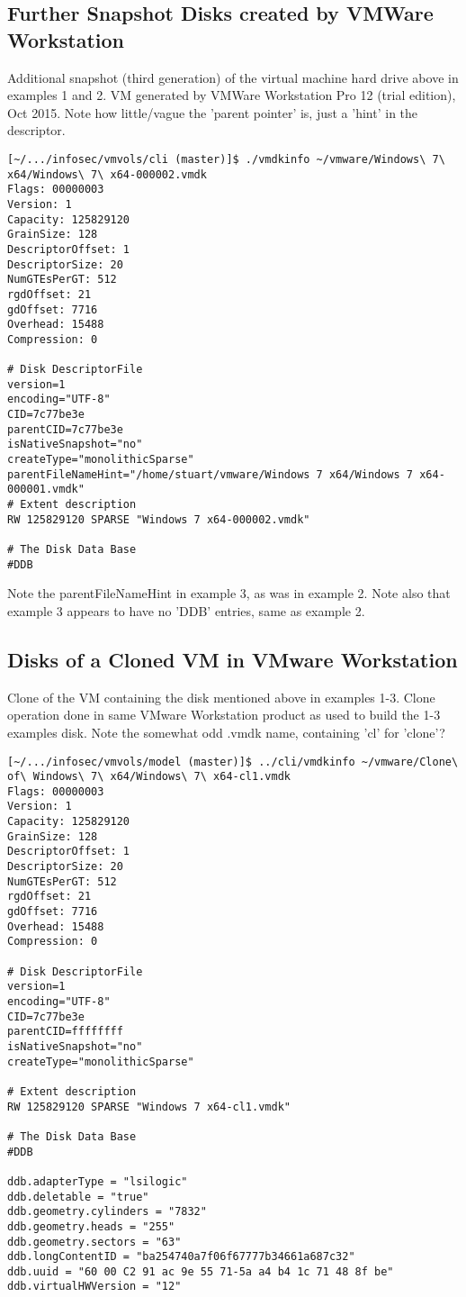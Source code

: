 \documentclass{article}
\begin{document}
\subsection{Further Snapshot Disks created by VMWare Workstation}

Additional snapshot (third generation) of the virtual machine hard
drive above in examples 1 and 2. VM generated by VMWare Workstation
Pro 12 (trial edition), Oct 2015.  Note how little/vague the 'parent
pointer' is, just a 'hint' in the descriptor.

\begin{verbatim}
[~/.../infosec/vmvols/cli (master)]$ ./vmdkinfo ~/vmware/Windows\ 7\ x64/Windows\ 7\ x64-000002.vmdk 
Flags: 00000003
Version: 1
Capacity: 125829120
GrainSize: 128
DescriptorOffset: 1
DescriptorSize: 20
NumGTEsPerGT: 512
rgdOffset: 21
gdOffset: 7716
Overhead: 15488
Compression: 0

# Disk DescriptorFile
version=1
encoding="UTF-8"
CID=7c77be3e
parentCID=7c77be3e
isNativeSnapshot="no"
createType="monolithicSparse"
parentFileNameHint="/home/stuart/vmware/Windows 7 x64/Windows 7 x64-000001.vmdk"
# Extent description
RW 125829120 SPARSE "Windows 7 x64-000002.vmdk"

# The Disk Data Base 
#DDB
\end{verbatim}

Note the parentFileNameHint in example 3, as was in example 2.  Note
also that example 3 appears to have no 'DDB' entries, same as example 2.

\subsection{Disks of a Cloned VM in VMware Workstation}

Clone of the VM containing the disk mentioned above in examples 1-3.
Clone operation done in same VMware Workstation product as used to
build the 1-3 examples disk.  Note the somewhat odd .vmdk name,
containing 'cl' for 'clone'?

\begin{verbatim}
[~/.../infosec/vmvols/model (master)]$ ../cli/vmdkinfo ~/vmware/Clone\ of\ Windows\ 7\ x64/Windows\ 7\ x64-cl1.vmdk 
Flags: 00000003
Version: 1
Capacity: 125829120
GrainSize: 128
DescriptorOffset: 1
DescriptorSize: 20
NumGTEsPerGT: 512
rgdOffset: 21
gdOffset: 7716
Overhead: 15488
Compression: 0

# Disk DescriptorFile
version=1
encoding="UTF-8"
CID=7c77be3e
parentCID=ffffffff
isNativeSnapshot="no"
createType="monolithicSparse"

# Extent description
RW 125829120 SPARSE "Windows 7 x64-cl1.vmdk"

# The Disk Data Base 
#DDB

ddb.adapterType = "lsilogic"
ddb.deletable = "true"
ddb.geometry.cylinders = "7832"
ddb.geometry.heads = "255"
ddb.geometry.sectors = "63"
ddb.longContentID = "ba254740a7f06f67777b34661a687c32"
ddb.uuid = "60 00 C2 91 ac 9e 55 71-5a a4 b4 1c 71 48 8f be"
ddb.virtualHWVersion = "12"
\end{verbatim}
\end{document}
